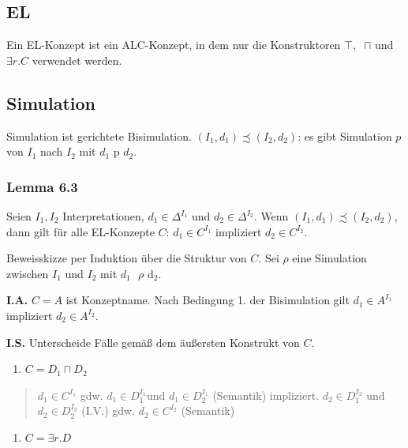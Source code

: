 
\subsection{EL}\label{el}

Ein EL-Konzept ist ein ALC-Konzept, in dem nur die Konstruktoren
$\top,\ $ $\sqcap$ und $\exists r.C$ verwendet werden.

\subsection{Simulation}\label{simulation}

Simulation ist gerichtete Bisimulation.
$\left( I_{1},d_{1} \right) \precsim \left( I_{2},d_{2} \right)$: es
gibt Simulation $p$ von $I_{1}$ nach $I_{2}$ mit
$d_{1}\text{\ p\ }d_{2}$.

\hypertarget{lemma-6.3}{\subsubsection{Lemma 6.3}\label{lemma-6.3}}

Seien $I_{1},I_{2}$ Interpretationen, $d_{1} \in \Delta^{I_{1}}$ und
$d_{2} \in \Delta^{I_{2}}$. Wenn
$\left( I_{1},d_{1} \right) \precsim \left( I_{2},d_{2} \right)$, dann
gilt für alle EL-Konzepte $C$: $d_{1} \in C^{I_{1}}$ impliziert
$d_{2} \in C^{I_{2}}$.

Beweisskizze per Induktion über die Struktur von $C$. Sei $\rho$
eine Simulation zwischen $I_{1}$ und $I_{2}$ mit
$d_{1}\text{\ $\rho$}\text{\ d}_{2}$.

\textbf{I.A.} $C = A$ ist Konzeptname. Nach Bedingung 1. der
Bisimulation gilt $d_{1} \in A^{I_{1}}$ impliziert
$d_{2} \in A^{I_{2}}$.

\textbf{I.S.} Unterscheide Fälle gemäß dem äußersten Konstrukt von
$C$.

\begin{enumerate}
\def\labelenumi{\arabic{enumi}.}
\item
  $C = D_{1} \sqcap D_{2}$
\end{enumerate}

\begin{quote}
$d_{1} \in C^{I_{1}}$ gdw. $d_{1} \in D_{1}^{I_{1}}$und
$d_{1} \in D_{2}^{I_{1}}$ (Semantik) impliziert.
$d_{2} \in D_{1}^{I_{2}}$ und $d_{2} \in D_{2}^{I_{2}}$ (I.V.) gdw.
$d_{2} \in C^{I_{2}}$ (Semantik)
\end{quote}

\begin{enumerate}
\def\labelenumi{\arabic{enumi}.}
\item
  $C = \exists r.D$
\end{enumerate}

